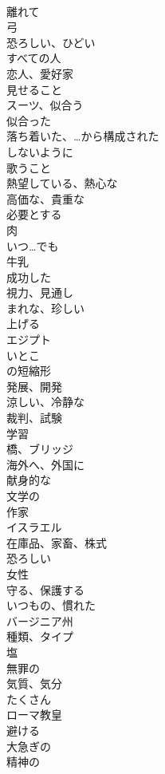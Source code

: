\documentclass[8pt]{extreport}
\begin{document}
\begin{CJK}{UTF8}{min}
\\	離れて
\\	弓
\\	恐ろしい、ひどい
\\	すべての人
\\	恋人、愛好家
\\	見せること
\\	スーツ、似合う
\\	似合った
\\	落ち着いた、…から構成された
\\	しないように
\\	歌うこと
\\	熱望している、熱心な
\\	高価な、貴重な
\\	必要とする
\\	肉
\\	いつ…でも
\\	牛乳
\\	成功した
\\	視力、見通し
\\	まれな、珍しい
\\	上げる
\\	エジプト
\\	いとこ
\\	の短縮形
\\	発展、開発
\\	涼しい、冷静な
\\	裁判、試験
\\	学習
\\	橋、ブリッジ
\\	海外へ、外国に
\\	献身的な
\\	文学の
\\	作家
\\	イスラエル
\\	在庫品、家畜、株式
\\	恐ろしい
\\	女性
\\	守る、保護する
\\	いつもの、慣れた
\\	バージニア州
\\	種類、タイプ
\\	塩
\\	無罪の
\\	気質、気分
\\	たくさん
\\	ローマ教皇
\\	避ける
\\	大急ぎの
\\	精神の

\end{CJK}
\end{document}
